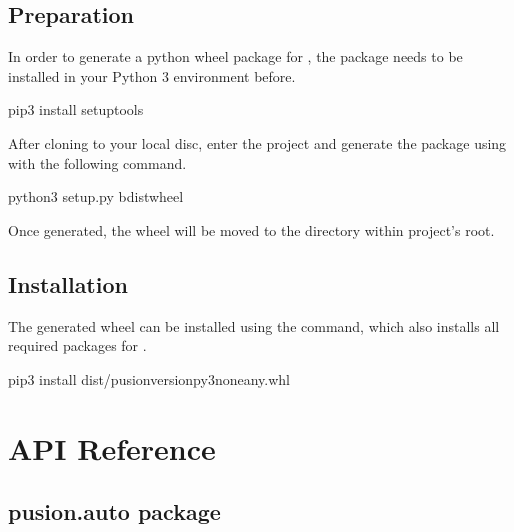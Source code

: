 \documentclass[letterpaper,10pt,english]{sphinxmanual}
\begin{document}
\section{Preparation}
\label{\detokenize{install:preparation}}
\sphinxAtStartPar
In order to generate a python wheel package for , the package  needs to be installed in your Python
3 environment before.

\begin{sphinxVerbatim}[commandchars=\\\{\}]
pip3 install setuptools
\end{sphinxVerbatim}

\sphinxAtStartPar
After cloning  to your local disc, enter the project and generate the package using with the following command.

\begin{sphinxVerbatim}[commandchars=\\\{\}]
python3 setup.py bdist\PYGZus{}wheel
\end{sphinxVerbatim}

\sphinxAtStartPar
Once generated, the wheel will be moved to the  directory within project’s root.


\section{Installation}
\label{\detokenize{install:installation}}
\sphinxAtStartPar
The generated wheel can be installed using the  command, which also installs all required packages for .

\begin{sphinxVerbatim}[commandchars=\\\{\}]
pip3 install dist/pusion\PYGZhy{}\PYGZlt{}version\PYGZgt{}\PYGZhy{}py3\PYGZhy{}none\PYGZhy{}any.whl
\end{sphinxVerbatim}


\chapter{API Reference}
\label{\detokenize{pusion:api-reference}}\label{\detokenize{pusion::doc}}

\section{pusion.auto package}
\label{\detokenize{pusion.auto:pusion-auto-package}}\label{\detokenize{pusion.auto::doc}}
\end{document}
